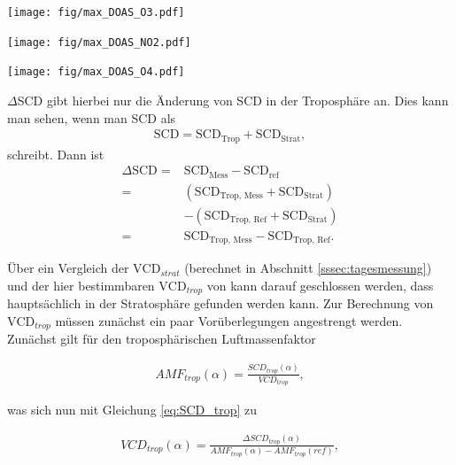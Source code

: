 \documentclass[12pt, a4paper, bibliography=totoc]{scrartcl}
\begin{document}
\begin{multicols}{2}
\begin{center}
	\texttt{[image: fig/max\_DOAS\_O3.pdf]}
	\label{fig:max_doas_o3}
\end{center}

\begin{center}
	\texttt{[image: fig/max\_DOAS\_NO2.pdf]}
	\label{fig:max_doas_no2}
\end{center}

\begin{center}
	\texttt{[image: fig/max\_DOAS\_O4.pdf]}
	\label{fig:max_doas_o4}
\end{center}

$\Delta$SCD gibt hierbei nur die Änderung von SCD in der Troposphäre an.
Dies kann man sehen, wenn man SCD als
\begin{align}
    \text{SCD} = \text{SCD}_\text{Trop} + \text{SCD}_\text{Strat},
\end{align}
schreibt.
Dann ist 
\begin{align}
\Delta\text{SCD} =& \text{SCD}_{\text{Mess}} - \text{SCD}_\text{ref} \\
    =& (\text{SCD}_{\text{Trop, \ Mess}} + \text{SCD}_{\text{Strat}}) \\
    & - (\text{SCD}_{\text{Trop, \ Ref}} + \text{SCD}_{\text{Strat}}) \\
    =& \text{SCD}_{\text{Trop, \ Mess}} - \text{SCD}_{\text{Trop, \ Ref}}. \label{eq:SCD_trop}
\end{align}

Über ein Vergleich der $\text{VCD}_{strat}$ (berechnet in Abschnitt \ref{sssec:tagesmessung})
und der hier bestimmbaren $\text{VCD}_{trop}$  von  kann darauf geschlossen werden, dass  hauptsächlich in der Stratosphäre gefunden werden kann.
Zur Berechnung von $\text{VCD}_{trop}$ müssen zunächst ein paar Vorüberlegungen angestrengt werden.
Zunächst gilt für den troposphärischen Luftmassenfaktor

\begin{align}
AMF_{trop}(\alpha) = \frac{SCD_{trop}(\alpha)}{VCD_{trop}},
\end{align}

was sich nun mit Gleichung \ref{eq:SCD_trop} zu 

\begin{align}
    VCD_{trop}(\alpha) = \frac{\Delta SCD_{trop}(\alpha)}{AMF_{trop}(\alpha)-AMF_{trop}(ref)}, 
\end{align} 


\end{multicols}
\end{document}
